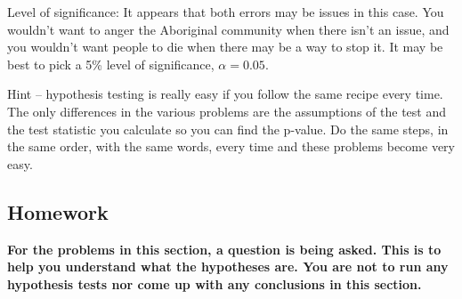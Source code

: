 \documentclass[
]{book}
\begin{document}
Level of significance: It appears that both errors may be issues in this case. You wouldn't want to anger the Aboriginal community when there isn't an issue, and you wouldn't want people to die when there may be a way to stop it. It may be best to pick a 5\% level of significance, \(\alpha=0.05\).

Hint -- hypothesis testing is really easy if you follow the same recipe every time. The only differences in the various problems are the assumptions of the test and the test statistic you calculate so you can find the p-value. Do the same steps, in the same order, with the same words, every time and these problems become very easy.

\hypertarget{homework-16}{%
\subsection{Homework}\label{homework-16}}

\textbf{For the problems in this section, a question is being asked. This is to help you understand what the hypotheses are. You are not to run any hypothesis tests nor come up with any conclusions in this section.}
\end{document}
